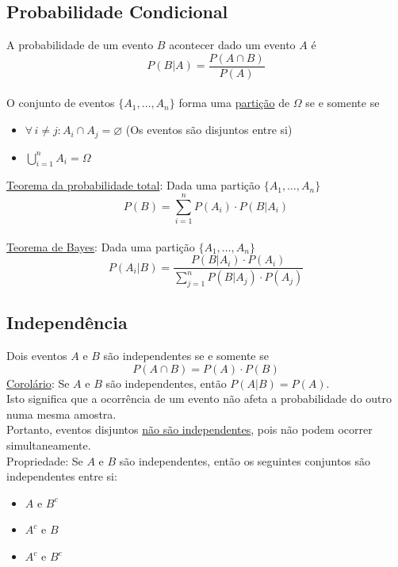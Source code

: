 \documentclass{article}
\begin{document}
\subsection{Probabilidade Condicional}
A probabilidade de um evento $B$ acontecer dado um evento $A$ é
\[ P(B|A) = \frac{P(A \cap B)}{P(A)} \] \\
O conjunto de eventos $\{ A_1, \hdots, A_n \}$ forma uma \uline{partição} de $\Omega$ se e somente se
\begin{itemize}
  \item $\forall \, i \neq j: A_i \cap A_j = \varnothing$ \quad (Os eventos são disjuntos entre si)
  \item $\bigcup\limits_{i=1}^{n} A_i = \Omega$
\end{itemize}
\vspace{5pt}
\uline{Teorema da probabilidade total}: Dada uma partição $\{ A_1, \hdots, A_n \}$
\[ P(B) = \sum_{i = 1}^{n} P(A_i) \cdot P(B|A_i) \] \\
\uline{Teorema de Bayes}: Dada uma partição $\{ A_1, \hdots, A_n \}$
\[ P(A_i|B) = \frac{P(B|A_i) \cdot P(A_i)}{\sum\limits_{j=1}^{n} P(B|A_j) \cdot P(A_j)} \]


\subsection{Independência}
Dois eventos $A$ e $B$ são independentes se e somente se
\[ P(A \cap B) = P(A) \cdot P(B) \]
\uline{Corolário}: Se $A$ e $B$ são independentes, então $P(A|B) = P(A)$. \\[10pt]
Isto significa que a ocorrência de um evento não afeta a probabilidade do outro numa mesma amostra. \\
Portanto, eventos disjuntos \uline{não são independentes}, pois não podem ocorrer simultaneamente. \\[10pt]
Propriedade: Se $A$ e $B$ são independentes, então os seguintes conjuntos são independentes entre si:
\begin{itemize}
  \item $A$ e $B^c$
  \item $A^c$ e $B$
  \item $A^c$ e $B^c$
\end{itemize}
\end{document}
